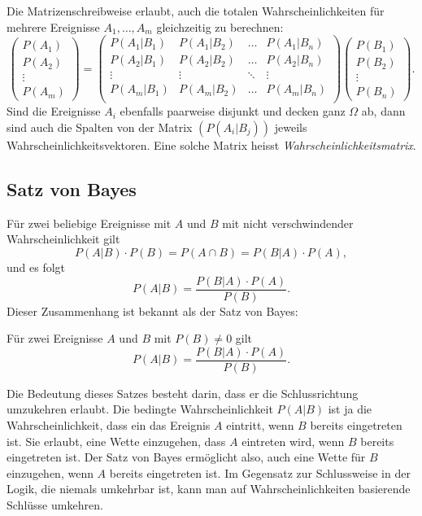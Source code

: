 Die Matrizenschreibweise erlaubt, auch die totalen Wahrscheinlichkeiten
für mehrere Ereignisse $A_1,\dots,A_m$ gleichzeitig zu berechnen:
\[
\begin{pmatrix}
P(A_1)\\
P(A_2)\\
\vdots\\
P(A_m)
\end{pmatrix}
=
\begin{pmatrix}
P(A_1|B_1) & P(A_1|B_2) & \dots &P(A_1|B_n)\\
P(A_2|B_1) & P(A_2|B_2) & \dots &P(A_2|B_n)\\
\vdots     & \vdots     & \ddots&\vdots\\
P(A_m|B_1) & P(A_m|B_2) & \dots &P(A_m|B_n)\\
\end{pmatrix}
\begin{pmatrix}
P(B_1)\\
P(B_2)\\
\vdots\\
P(B_n)
\end{pmatrix}.
\]
Sind die Ereignisse $A_i$ ebenfalls paarweise disjunkt und decken ganz
$\Omega$ ab, dann sind auch die Spalten von der Matrix $(P(A_i|B_j))$
jeweils Wahrscheinlichkeitsvektoren.
Eine solche Matrix heisst {\it Wahrscheinlichkeitsmatrix}.

\subsection{Satz von Bayes} \label{satz-von-bayes}
Für zwei beliebige Ereignisse mit $A$ und $B$ mit nicht verschwindender
Wahrscheinlichkeit gilt
\[
P(A|B)\cdot P(B)= P(A\cap B)=P(B|A)\cdot P(A),
\]
und es folgt
\[
P(A|B)=\frac{P(B|A)\cdot P(A)}{P(B)}.
\]
Dieser Zusammenhang ist bekannt als der Satz von Bayes:
\begin{satz}
Für zwei Ereignisse $A$ und $B$ mit $P(B)\ne0$ gilt
\[
P(A|B)=\frac{P(B|A)\cdot P(A)}{P(B)}.
\]
\end{satz}
Die Bedeutung dieses Satzes besteht darin, dass er die Schlussrichtung
umzukehren erlaubt.
Die bedingte Wahrscheinlichkeit $P(A|B)$ ist ja die
Wahrscheinlichkeit, dass ein das Ereignis $A$ eintritt, wenn $B$ bereits
eingetreten ist.
Sie erlaubt, eine Wette einzugehen, dass $A$ eintreten
wird, wenn $B$ bereits eingetreten ist.
Der Satz von Bayes ermöglicht
also, auch eine Wette für $B$ einzugehen, wenn $A$ bereits eingetreten
ist.
Im Gegensatz zur Schlussweise in der Logik, die niemals umkehrbar ist,
kann man auf Wahrscheinlichkeiten basierende Schlüsse umkehren.

